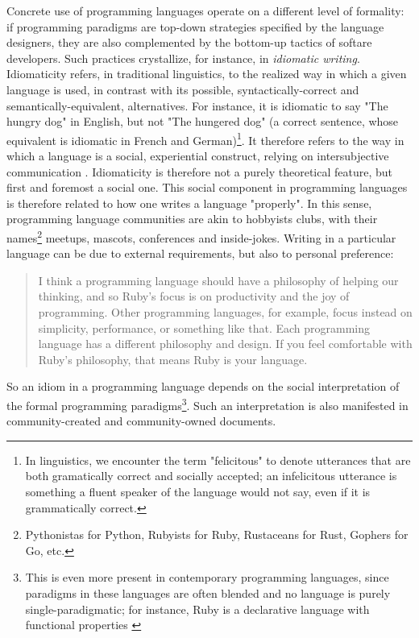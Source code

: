 Concrete use of programming languages operate on a different level of formality: if programming paradigms are top-down strategies specified by the language designers, they are also complemented by the bottom-up tactics of softare developers. Such practices crystallize, for instance, in \emph{idiomatic writing}. Idiomaticity refers, in traditional linguistics, to the realized way in which a given language is used, in contrast with its possible, syntactically-correct and semantically-equivalent, alternatives. For instance, it is idiomatic to say "The hungry dog" in English, but not "The hungered dog" (a correct sentence, whose equivalent is idiomatic in French and German)\footnote{In linguistics, we encounter the term "felicitous" to denote utterances that are both gramatically correct and socially accepted; an infelicitous utterance is something a fluent speaker of the language would not say, even if it is grammatically correct.}. It therefore refers to the way in which a language is a social, experiential construct, relying on intersubjective communication \citep{voloshinov_marxism_1986}. Idiomaticity is therefore not a purely theoretical feature, but first and foremost a social one. This social component in programming languages is therefore related to how one writes a language "properly". In this sense, programming language communities are akin to hobbyists clubs, with their names\footnote{Pythonistas for Python, Rubyists for Ruby, Rustaceans for Rust, Gophers for Go, etc.} meetups, mascots, conferences and inside-jokes. Writing in a particular language can be due to external requirements, but also to personal preference:

\begin{quote}
  I think a programming language should have a philosophy of helping our thinking, and so Ruby's focus is on productivity and the joy of programming. Other programming languages, for example, focus instead on simplicity, performance, or something like that. Each programming language has a different philosophy and design. If you feel comfortable with Ruby's philosophy, that means Ruby is your language. \citep{matsumoto_yukihiro_2019}
\end{quote}

So an idiom in a programming language depends on the social interpretation of the formal programming paradigms\footnote{This is even more present in contemporary programming languages, since paradigms in these languages are often blended and no language is purely single-paradigmatic; for instance, Ruby is a declarative language with functional properties \citep{kidd_why_2005}}. Such an interpretation is also manifested in community-created and community-owned documents.

